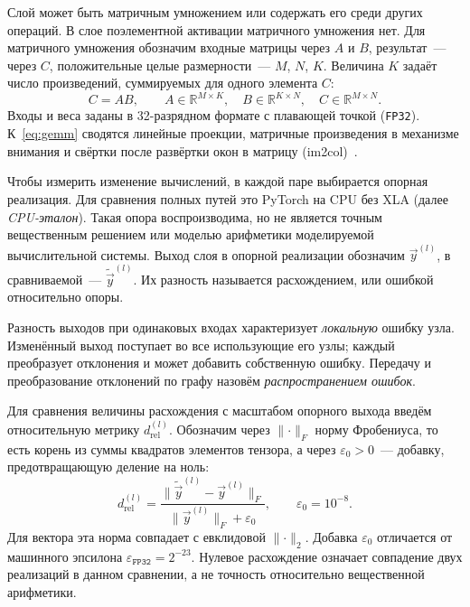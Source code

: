Слой может быть матричным умножением или содержать его среди других
операций. В слое поэлементной активации матричного умножения нет.
Для матричного умножения обозначим входные матрицы через $A$ и $B$,
результат~--- через $C$, положительные целые размерности~--- $M$, $N$, $K$.
Величина $K$ задаёт число произведений, суммируемых для одного элемента $C$:
\begin{equation}
    \label{eq:gemm}
    C=AB,\qquad
    A\in\mathbb{R}^{M\times K},\quad
    B\in\mathbb{R}^{K\times N},\quad
    C\in\mathbb{R}^{M\times N}.
\end{equation}
Входы и веса заданы в 32-разрядном формате с плавающей точкой
(\texttt{FP32}). К~\eqref{eq:gemm} сводятся линейные проекции,
матричные произведения в механизме внимания и свёртки после развёртки окон
в матрицу (im2col)~\cite{Chellapilla2006}.

Чтобы измерить изменение вычислений, в каждой паре выбирается опорная
реализация. Для сравнения полных путей это PyTorch на CPU без XLA
(далее \emph{CPU-эталон}). Такая опора воспроизводима, но не является
точным вещественным решением или моделью арифметики моделируемой
вычислительной системы.
Выход слоя в опорной реализации обозначим $\Vec{y}^{(l)}$,
в сравниваемой~--- $\widetilde{\Vec{y}}^{(l)}$.
Их разность называется расхождением, или ошибкой относительно опоры.

Разность выходов при одинаковых входах характеризует \emph{локальную}
ошибку узла. Изменённый выход поступает во все использующие его узлы;
каждый преобразует отклонения и может добавить собственную ошибку.
Передачу и преобразование отклонений по графу назовём
\emph{распространением ошибок}.

Для сравнения величины расхождения с масштабом опорного выхода
введём относительную метрику $d_{\mathrm{rel}}^{(l)}$.
Обозначим через $\lVert\cdot\rVert_F$ норму Фробениуса,
то есть корень из суммы квадратов элементов тензора,
а через $\varepsilon_0>0$~--- добавку, предотвращающую деление на ноль:
\begin{equation}
    \label{eq:drel}
    d_{\mathrm{rel}}^{(l)}=
    \frac{\|\widetilde{\Vec{y}}^{(l)}-\Vec{y}^{(l)}\|_F}
         {\|\Vec{y}^{(l)}\|_F+\varepsilon_0},\qquad
    \varepsilon_0=10^{-8}.
\end{equation}
Для вектора эта норма совпадает с евклидовой $\lVert\cdot\rVert_2$.
Добавка $\varepsilon_0$ отличается от машинного эпсилона
$\varepsilon_{\texttt{FP32}}=2^{-23}$.
Нулевое расхождение означает совпадение двух реализаций
в данном сравнении, а не точность относительно вещественной арифметики.

